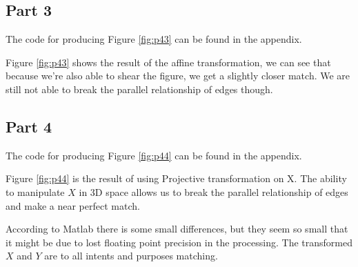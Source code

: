 \subsection{Part 3}
The code for producing Figure \ref{fig:p43} can be found in the appendix.

Figure \ref{fig:p43} shows the result of the affine transformation, we can see that because we're also
able to shear the figure, we get a slightly closer match. We are still not able to break the parallel relationship of edges though.


\subsection{Part 4}
The code for producing Figure \ref{fig:p44} can be found in the appendix.

Figure \ref{fig:p44} is the result of using Projective transformation on X. The ability to manipulate
$X$ in 3D space allows us to break the parallel relationship of edges and make a near perfect match.

According to Matlab there is some small differences, but they seem so small that it might be due to
lost floating point precision in the processing. The transformed $X$ and $Y$ are to all intents and
purposes matching.